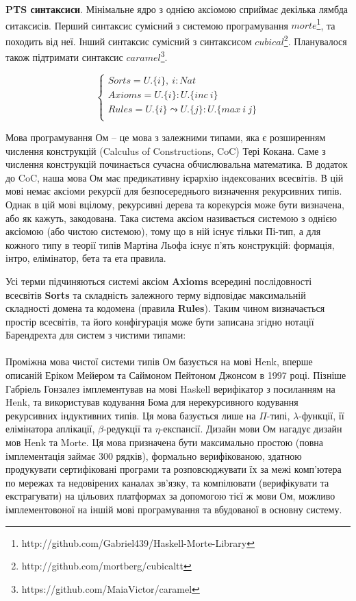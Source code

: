 {\bf PTS синтаксиси}. Мінімальне ядро з однією аксіомою
сприймає декілька лямбда ситаксисів.
Перший синтаксис сумісний з системою програмування
$morte$\footnote{http://github.com/Gabriel439/Haskell-Morte-Library}, та походить від неї.
Інший синтаксис сумісний з синтаксисом $cubical$\footnote{http://github.com/mortberg/cubicaltt}.
Планувалося також підтримати синтаксис $caramel$\footnote{https://github.com/MaiaVictor/caramel}.

$$
\begin{cases}
Sorts = U.\{i\},\ i : Nat\\
Axioms = U.\{i\} : U.\{inc\ i\}\\
Rules = U.\{i\} \leadsto U.\{j\} : U.\{max\ i\ j\}\\
\end{cases}
$$

Мова програмування Ом -- це мова з залежними типами, яка є розширенням
числення конструкцій (Calculus of Constructions, CoC) Тері Кокана. Саме з числення
конструкцій починається сучасна обчислювальна математика. В додаток до CoC,
наша мова Ом має предикативну ієрархію індексованих всесвітів. В цій мові немає
аксіоми рекурсії для безпосереднього визначення рекурсивних типів. Однак в цій мові
вцілому, рекурсивні дерева та корекурсія може бути визначена, або як кажуть, закодована.
Така система аксіом називається системою з однією аксіомою (або чистою системою), тому що в ній
існує тільки Пі-тип, а для кожного типу в теорії типів Мартіна Льофа існує п'ять
конструкцій: формація, інтро, елімінатор, бета та ета правила.

Усі терми підчиняються системі аксіом {\bf Axioms} всередині
послідовності всесвітів {\bf Sorts} та складність залежного
терму відповідає максимальній складності домена та кодомена
(правила {\bf Rules}). Таким чином визначається простір всесвітів,
та його конфігурація може бути записана згідно нотації
Барендрехта для систем з чистими типами:


\paragraph{}
Проміжна мова чистої системи типів Ом базується на мові
Henk\cite{Erik97}, вперше описаній Еріком Мейером та Саймоном Пейтоном Джонсом в 1997 році.
Пізніше Габріель Гонзалез імплементував на мові Haskell
верифікатор з посиланням на Henk, та використував кодування Бома для нерекурсивного
кодування рекурсивних індуктивних типів. Ця мова базується лише на $\Pi$-типі,
$\lambda$-функції, її елімінатора аплікації, $\beta$-редукції та $\eta$-експансії.
Дизайн мови Ом нагадує дизайн мов Henk та Morte.
Ця мова призначена бути максимально простою (повна імплементація займає 300 рядків),
формально верифікованою, здатною продукувати сертифіковані програми та
розповсюджувати їх за межі комп'ютера по мережах та недовірених каналах зв'язку,
та компілювати (верифікувати та екстрагувати) на цільових платформах за допомогою
тієї ж мови Ом, можливо імплементовоної на іншій мові програмування та вбудованої
в основну систему.

